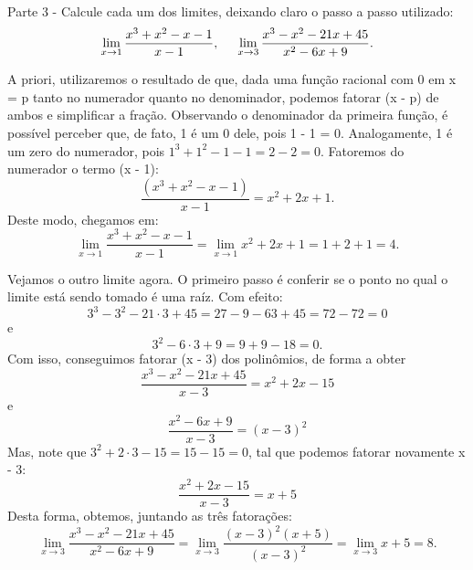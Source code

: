 \paragraph{} Parte 3 - Calcule cada um dos limites, deixando claro o passo a passo utilizado: 
$$
\lim_{x\to1} \frac{x^3 + x^2 - x - 1}{x - 1}, \hspace{0.5cm} \lim_{x\to3}\frac{x^3 - x^2 - 21x + 45}{x^2 - 6x + 9}.
$$
\begin{sol*}
A priori, utilizaremos o resultado de que, dada uma fun\c c\~ao racional com 0 em x = p tanto no numerador quanto no denominador, podemos fatorar (x - p) de ambos e simplificar a fra\c c\~ao. Observando o denominador da primeira fun\c c\~ao, \'e poss\'ivel perceber que, de fato, 1 \'e um 0 dele, pois 1 - 1 = 0. Analogamente, 1 \'e um zero do numerador, pois $1^3 + 1^2 - 1 - 1 = 2 - 2 = 0$. Fatoremos do numerador o termo (x - 1):
$$
\frac{(x^3 + x^2 - x - 1)}{x - 1} = x^2 + 2x + 1.
$$
Deste modo, chegamos em: 
$$
\lim_{x\to{1}}\frac{x^3 + x^2 - x - 1}{x - 1} = \lim_{x\to{1}}x^2 + 2x + 1 = 1 + 2 + 1 = 4.
$$

Vejamos o outro limite agora. O primeiro passo \'e conferir se o ponto no qual o limite est\'a sendo tomado \'e uma ra\'iz. Com efeito:
$$
3^3 - 3^2 - 21\cdot{3} + 45 = 27 - 9 - 63 + 45 = 72 - 72 = 0 
$$
e
$$
3^2 - 6\cdot{3} + 9 = 9 + 9 - 18 = 0.
$$
Com isso, conseguimos fatorar (x - 3) dos polin\^omios, de forma a obter
$$
\frac{x^3 - x^2 - 21x + 45}{x-3} = x^2 + 2x - 15
$$
e
$$
\frac{x^2 - 6x + 9}{x - 3}  = (x - 3)^2
$$
Mas, note que $3^2 + 2\cdot{3} - 15 = 15 - 15 = 0$, tal que podemos fatorar novamente x - 3:
$$
\frac{x^2 + 2x - 15}{x - 3} = x + 5
$$
Desta forma, obtemos, juntando as tr\^es fatora\c c\~oes:
$$
\lim_{x\to3}\frac{x^3 - x^2 - 21x + 45}{x^2 - 6x + 9} = \lim_{x\to3}\frac{(x - 3)^2 (x+5)}{(x - 3)^2} = \lim_{x\to3}x + 5 = 8.
$$
\qedsymbol
\end{sol*}